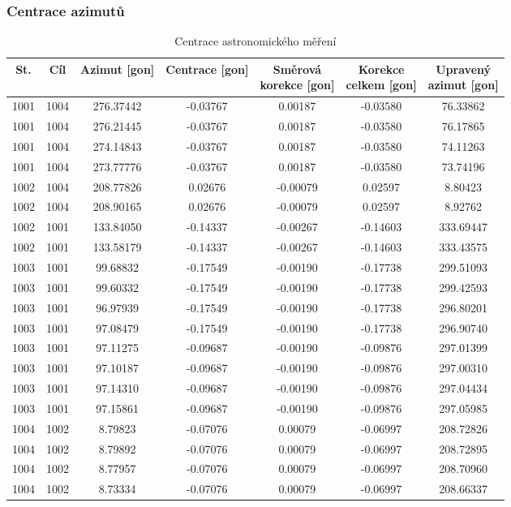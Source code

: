 \subsubsection{Centrace azimutů}
\begin{table}[H]
\centering
\caption{Centrace astronomického měření}
\begin{tabular}{|c|c|c||c|c|c||c|}
\hline
\textbf{St.} & \textbf{Cíl} & \textbf{Azimut [gon]} & \textbf{Centrace [gon]} & \makecell{\textbf{Směrová}\\\textbf{korekce [gon]}} & \makecell{\textbf{Korekce}\\ \textbf{celkem  [gon]}}& \makecell{\textbf{Upravený}\\ \textbf{azimut [gon]}}\\
\hline\hline
1001 & 1004 & 276.37442 & -0.03767 & 0.00187 & -0.03580 & 76.33862 \\ \hline
1001 & 1004 & 276.21445 & -0.03767 & 0.00187 & -0.03580 & 76.17865 \\ \hline
1001 & 1004 & 274.14843 & -0.03767 & 0.00187 & -0.03580 & 74.11263 \\ \hline
1001 & 1004 & 273.77776 & -0.03767 & 0.00187 & -0.03580 & 73.74196 \\ \hline
1002 & 1004 & 208.77826 & 0.02676 & -0.00079 & 0.02597 & 8.80423 \\ \hline
1002 & 1004 & 208.90165 & 0.02676 & -0.00079 & 0.02597 & 8.92762 \\ \hline
1002 & 1001 & 133.84050 & -0.14337 & -0.00267 & -0.14603 & 333.69447 \\ \hline
1002 & 1001 & 133.58179 & -0.14337 & -0.00267 & -0.14603 & 333.43575 \\ \hline
1003 & 1001 & 99.68832 & -0.17549 & -0.00190 & -0.17738 & 299.51093 \\ \hline
1003 & 1001 & 99.60332 & -0.17549 & -0.00190 & -0.17738 & 299.42593 \\ \hline
1003 & 1001 & 96.97939 & -0.17549 & -0.00190 & -0.17738 & 296.80201 \\ \hline
1003 & 1001 & 97.08479 & -0.17549 & -0.00190 & -0.17738 & 296.90740 \\ \hline
1003 & 1001 & 97.11275 & -0.09687 & -0.00190 & -0.09876 & 297.01399 \\ \hline
1003 & 1001 & 97.10187 & -0.09687 & -0.00190 & -0.09876 & 297.00310 \\ \hline
1003 & 1001 & 97.14310 & -0.09687 & -0.00190 & -0.09876 & 297.04434 \\ \hline
1003 & 1001 & 97.15861 & -0.09687 & -0.00190 & -0.09876 & 297.05985 \\ \hline
1004 & 1002 & 8.79823 & -0.07076 & 0.00079 & -0.06997 & 208.72826 \\ \hline
1004 & 1002 & 8.79892 & -0.07076 & 0.00079 & -0.06997 & 208.72895 \\ \hline
1004 & 1002 & 8.77957 & -0.07076 & 0.00079 & -0.06997 & 208.70960 \\ \hline
1004 & 1002 & 8.73334 & -0.07076 & 0.00079 & -0.06997 & 208.66337 \\
\hline
\end{tabular}
\end{table}


